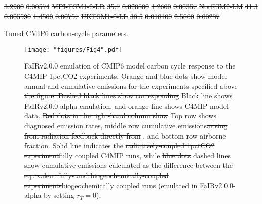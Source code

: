 \documentclass[gmd, manuscript]{copernicus}
\providecommand{\DIFadd}[1]{{\protect\color{blue}#1}} %
\providecommand{\DIFdel}[1]{{\protect\color{red}\sout{#1}}}                      %
\providecommand{\DIFaddbegin}{} %
\providecommand{\DIFaddend}{} %
\providecommand{\DIFdelend}{} %
\providecommand{\DIFaddFL}[1]{\DIFadd{#1}} %
\providecommand{\DIFdelFL}[1]{\DIFdel{#1}} %
\providecommand{\DIFaddbeginFL}{} %
\providecommand{\DIFaddendFL}{} %
\providecommand{\DIFdelbeginFL}{} %
\providecommand{\DIFdelendFL}{} %
\begin{document}
\DIFdel{3.2900 }%
\DIFdel{0.00574 }%
\DIFdel{MPI-ESM1-2-LR }%
\DIFdel{35.7 }%
\DIFdel{0.020800 }%
\DIFdel{1.2600 }%
\DIFdel{0.00357 }%
\DIFdel{NorESM2-LM    }%
\DIFdel{41.3 }%
\DIFdel{0.005590 }%
\DIFdel{1.4500 }%
\DIFdel{0.00757 }%
\DIFdel{UKESM1-0-LL   }%
\DIFdel{38.5 }%
\DIFdel{0.018100 }%
\DIFdel{2.5800 }%
\DIFdel{0.00287 }%
\DIFdelend \DIFaddbegin \clearpage
\begin{table}[t]
    \caption{\DIFaddFL{Tuned CMIP6 carbon-cycle parameters.}}
    \label{table:cc_p}
    
\end{table}
\clearpage
\DIFaddend \begin{figure}[t]
    \DIFdelbeginFL %
\DIFdelendFL \DIFaddbeginFL \texttt{[image: "figures/Fig4".pdf]}
    \DIFaddendFL \caption{FaIRv2.0\DIFaddbeginFL \DIFaddFL{.0 }\DIFaddendFL emulation of CMIP6 model carbon cycle response to the C4MIP 1pctCO2 experiments. \DIFdelbeginFL \DIFdelFL{Orange and blue dots show model annual and cumulative emissions for the experiments specified above the figure. Dashed black lines show corresponding }\DIFdelendFL \DIFaddbeginFL \DIFaddFL{Black line shows }\DIFaddendFL FaIRv2.0\DIFaddbeginFL \DIFaddFL{.0-alpha }\DIFaddendFL emulation\DIFaddbeginFL \DIFaddFL{, and orange line shows C4MIP model data}\DIFaddendFL . \DIFdelbeginFL \DIFdelFL{Red dots in the right-hand column show }\DIFdelendFL \DIFaddbeginFL \DIFaddFL{Top row shows diagnosed emission rates, middle row }\DIFaddendFL cumulative emissions\DIFdelbeginFL \DIFdelFL{arising from radiation feedback directly from }\DIFdelendFL \DIFaddbeginFL \DIFaddFL{, and bottom row airborne fraction. Solid line indicates }\DIFaddendFL the \DIFdelbeginFL \DIFdelFL{radiatively-coupled 1pctCO2 experiment}\DIFdelendFL \DIFaddbeginFL \DIFaddFL{fully coupled C4MIP runs}\DIFaddendFL , while \DIFdelbeginFL \DIFdelFL{blue dots }\DIFdelendFL \DIFaddbeginFL \DIFaddFL{dashed lines }\DIFaddendFL show \DIFdelbeginFL \DIFdelFL{cumulative emissions calculated as the difference between the equivalent fully- and biogeochemically-coupled experiments}\DIFdelendFL \DIFaddbeginFL \DIFaddFL{biogeochemically coupled runs (emulated in FaIRv2.0.0-alpha by setting $r_T=0$)}\DIFaddendFL .}
    \label{fig:cc_emulation}
\end{figure}
\clearpage
\end{document}
